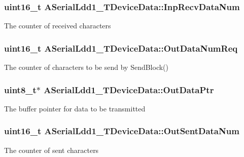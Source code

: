 \subsubsection[{\texorpdfstring{Inp\+Recv\+Data\+Num}{InpRecvDataNum}}]{\setlength{\rightskip}{0pt plus 5cm}uint16\+\_\+t A\+Serial\+Ldd1\+\_\+\+T\+Device\+Data\+::\+Inp\+Recv\+Data\+Num}\hypertarget{struct_a_serial_ldd1___t_device_data_ae54e8bc2a6f1560a186cf4921de12747}{}\label{struct_a_serial_ldd1___t_device_data_ae54e8bc2a6f1560a186cf4921de12747}
The counter of received characters 
\subsubsection[{\texorpdfstring{Out\+Data\+Num\+Req}{OutDataNumReq}}]{\setlength{\rightskip}{0pt plus 5cm}uint16\+\_\+t A\+Serial\+Ldd1\+\_\+\+T\+Device\+Data\+::\+Out\+Data\+Num\+Req}\hypertarget{struct_a_serial_ldd1___t_device_data_a075ec547a9bd9c9e41181966a6b9b203}{}\label{struct_a_serial_ldd1___t_device_data_a075ec547a9bd9c9e41181966a6b9b203}
The counter of characters to be send by Send\+Block() 
\subsubsection[{\texorpdfstring{Out\+Data\+Ptr}{OutDataPtr}}]{\setlength{\rightskip}{0pt plus 5cm}uint8\+\_\+t$\ast$ A\+Serial\+Ldd1\+\_\+\+T\+Device\+Data\+::\+Out\+Data\+Ptr}\hypertarget{struct_a_serial_ldd1___t_device_data_a2a004530c79852f3a438dd1deda07c3a}{}\label{struct_a_serial_ldd1___t_device_data_a2a004530c79852f3a438dd1deda07c3a}
The buffer pointer for data to be transmitted 
\subsubsection[{\texorpdfstring{Out\+Sent\+Data\+Num}{OutSentDataNum}}]{\setlength{\rightskip}{0pt plus 5cm}uint16\+\_\+t A\+Serial\+Ldd1\+\_\+\+T\+Device\+Data\+::\+Out\+Sent\+Data\+Num}\hypertarget{struct_a_serial_ldd1___t_device_data_a84390528474a595546a2fbefdd3a63fd}{}\label{struct_a_serial_ldd1___t_device_data_a84390528474a595546a2fbefdd3a63fd}
The counter of sent characters 
